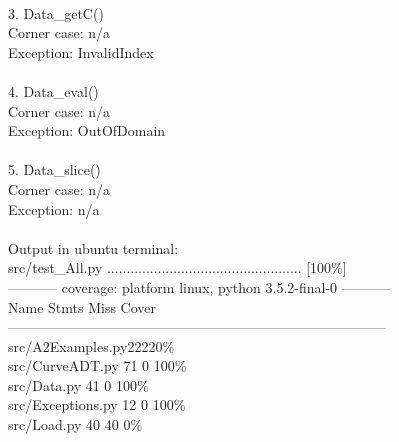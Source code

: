 \documentclass[12pt]{article}
\begin{document}
\\
3. Data\_getC()\\
\phantom{xx}  Corner case: n/a\\
\phantom{xx}  Exception: InvalidIndex\\
\\
4. Data\_eval()\\
\phantom{xx} Corner case: n/a\\
\phantom{xx}  Exception: OutOfDomain\\
\\
5. Data\_slice()\\
\phantom{xx}  Corner case: n/a\\
\phantom{xx}  Exception: n/a\\
\\
\Large Output in ubuntu terminal:\\
\normalsize
src/test\_All.py ..................................................   [100\%]\\
----------- coverage: platform linux, python 3.5.2-final-0 -----------\\
Name \hspace{26ex}                        Stmts\hspace{4ex}    Miss\hspace{3ex}    Cover\\
---------------------------------------------------------------------------------\\
src/A2Examples.py\hspace{17ex}22\hspace{8ex}22\hspace{6ex}0\%\\
src/CurveADT.py     \hspace{17ex}            71 \hspace{8ex}0\hspace{4ex}   100\%\\
src/Data.py             \hspace{23ex}            41 \hspace{7ex}     0 \hspace{3ex}  100\%\\
src/Exceptions.py    \hspace{17ex}             12\hspace{8ex}      0 \hspace{3ex}   100\%\\
src/Load.py           \hspace{23ex}              40\hspace{7ex}     40\hspace{6ex}       0\%\\
\end{document}
